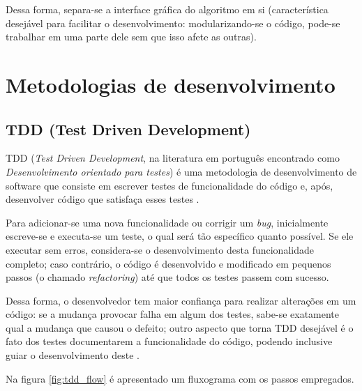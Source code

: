 Dessa forma, separa-se a interface gráfica do algoritmo em si (característica desejável para facilitar o desenvolvimento: modularizando-se o código, pode-se trabalhar em uma parte dele sem que isso afete as outras).

\section{Metodologias de desenvolvimento}
\subsection{TDD (Test Driven Development)}

TDD (\textit{Test Driven Development}, na literatura em português encontrado como \textit{Desenvolvimento orientado para testes}) é uma metodologia de desenvolvimento de software que consiste em escrever testes de funcionalidade do código e, após, desenvolver código que satisfaça esses testes \cite{tdd}. 

Para adicionar-se uma nova funcionalidade ou corrigir um \textit{bug}, inicialmente escreve-se e executa-se um teste, o qual será tão específico quanto possível. Se ele executar sem erros, considera-se o desenvolvimento desta funcionalidade completo; caso contrário, o código é desenvolvido e modificado em pequenos passos (o chamado \textit{refactoring}) até que todos os testes passem com sucesso.

Dessa forma, o desenvolvedor tem maior confiança para realizar alterações em um código: se a mudança provocar falha em algum dos testes, sabe-se exatamente qual a mudança que causou o defeito; outro aspecto que torna TDD desejável é o fato dos testes documentarem a funcionalidade do código, podendo inclusive guiar o desenvolvimento deste \cite{aniche}.

Na figura \ref{fig:tdd_flow} é apresentado um fluxograma com os passos empregados.

